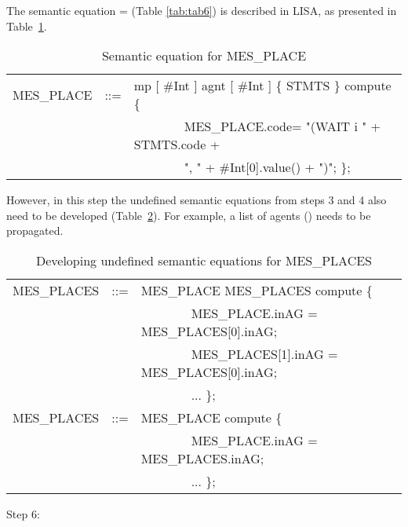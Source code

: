 \documentclass[preprint, prX]{revtex4}
\begin{document}
The semantic equation
 =   (Table \ref{tab:tab6}) is described in LISA, as presented in Table~\ref{tab:tab26}.

\begin{table}[htb]           \caption{Semantic equation for MES\_PLACE}
\label{tab:tab26}
\vspace{-5mm}
\footnotesize
\begin{center}
\begin{tabular}{ | l  l  l | }
\hline
MES\_PLACE & ::= & mp [ \#Int ]   agnt [ \#Int ] \{ STMTS \} compute \{ \\
 & & \ \ \ \ \ \ \ \ MES\_PLACE.code= "(WAIT i " + STMTS.code + \\
 & & \ \ \ \ \ \ \ \ ", " + \#Int[0].value() + ")"; \}; \\
\hline
\end{tabular}
\end{center}
\normalsize
\vspace{-5mm}
\end{table}

However, in this step the undefined semantic equations from steps 3 and 4 also need to be developed (Table~\ref{tab:tab27}). For example, a list of agents () needs to be propagated.

\begin{table}[htb]           \caption{Developing undefined semantic equations for MES\_PLACES}
\label{tab:tab27}
\vspace{-5mm}
\footnotesize
\begin{center}
\begin{tabular}{ | l  l  l | }
\hline
MES\_PLACES & ::= & MES\_PLACE MES\_PLACES compute \{ \\
 & & \ \ \ \ \ \ \ \ MES\_PLACE.inAG = MES\_PLACES[0].inAG; \\
 & & \ \ \ \ \ \ \ \ MES\_PLACES[1].inAG = MES\_PLACES[0].inAG; \\
 & & \ \ \ \ \ \ \ \ ...  \}; \\
MES\_PLACES & ::= & MES\_PLACE compute \{ \\
 & & \ \ \ \ \ \ \ \ MES\_PLACE.inAG = MES\_PLACES.inAG; \\
 & & \ \ \ \ \ \ \ \ ... \}; \\
\hline
\end{tabular}
\end{center}
\normalsize
\vspace{-5mm}
\end{table}

Step 6:
\end{document}
